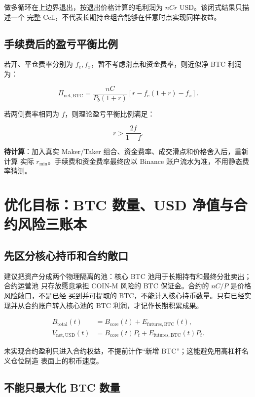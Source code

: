 \documentclass[11pt,a4paper,fontset=none]{ctexart}
\newcommand{\ResearchTask}{\textcolor{CoinGold}{\textbf{待计算}}}
\begin{document}
做多循环在上边界退出，按退出价格计算的毛利润为 $nCr$ USD。该闭式结果只描述一个
完整 Cell，不代表长期持仓组合能够在任意时点实现同样收益。

\subsection{手续费后的盈亏平衡比例}

若开、平仓费率分别为 $f_e,f_x$，暂不考虑滑点和资金费率，则近似净 BTC 利润为：

\begin{equation}
  \Pi_{\mathrm{net,BTC}}
  =\frac{nC}{P_b(1+r)}
   \left[r-f_e(1+r)-f_x\right].
\end{equation}

若两侧费率相同为 $f$，则理论盈亏平衡比例满足：

\begin{equation}
  r>\frac{2f}{1-f}.
\end{equation}

\ResearchTask：加入真实 Maker/Taker 组合、资金费率、成交滑点和价格舍入后，重新计算
实际 $r_{\min}$。手续费和资金费率最终应以 Binance 账户流水为准，不用静态费率猜测。

\section{优化目标：BTC 数量、USD 净值与合约风险三账本}

\subsection{先区分核心持币和合约敞口}

建议把资产分成两个物理隔离的池：核心 BTC 池用于长期持有和最终分批卖出；合约运营池
只存放愿意承担 COIN-M 风险的 BTC 保证金。合约的 $nC/P$ 是价格风险敞口，不是已经
买到并可提取的 BTC，不能计入核心持币数量。只有已经实现并从合约账户转入核心池的
BTC 利润，才记作长期积累成果。

\begin{align}
  B_{\mathrm{total}}(t)
  &=B_{\mathrm{core}}(t)+E_{\mathrm{futures,BTC}}(t),\\
  V_{\mathrm{net,USD}}(t)
  &=B_{\mathrm{core}}(t)P_t+E_{\mathrm{futures,BTC}}(t)P_t.
\end{align}

未实现合约盈利只进入合约权益，不提前计作“新增 BTC”；这能避免用高杠杆名义仓位制造
表面上的积币速度。

\subsection{不能只最大化 BTC 数量}
\end{document}
